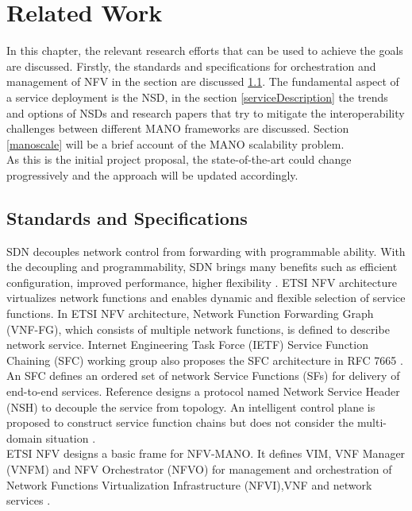 \chapter{Related Work}
\label{ch:Related Work}

In this chapter, the relevant research efforts that can be used to achieve the goals are discussed. Firstly, the standards and specifications for orchestration and management of NFV in the section are discussed \ref{standSpecs}. The fundamental aspect of a service deployment is the NSD, in the section \ref{serviceDescription} the trends and options of NSDs and research papers that try to mitigate the interoperability challenges between different MANO frameworks are discussed. Section \ref{manoscale} will be a brief account of the MANO scalability problem.\\

As this is the initial project proposal, the state-of-the-art could change progressively and the approach will be updated accordingly.


\section{Standards and Specifications}
\label{standSpecs}
SDN decouples network control from forwarding with programmable ability. With the decoupling and programmability, SDN brings many benefits such as efficient configuration, improved performance, higher flexibility \cite{xia2015survey}. ETSI NFV \cite{nfv2network} architecture virtualizes network functions and enables dynamic and flexible selection of service functions. In ETSI NFV architecture, Network Function Forwarding Graph (VNF-FG), which consists of multiple network functions, is defined to describe network service. Internet Engineering Task Force (IETF) Service Function Chaining (SFC) working group also proposes the SFC architecture in RFC 7665 \cite{halpern2015service}. An SFC defines an ordered set of network Service Functions (SFs) for delivery of end-to-end services. Reference \cite{quinn2016network} designs a protocol named Network Service Header (NSH) to decouple the service from topology. An intelligent control plane is proposed to construct service function chains but does not consider the multi-domain situation \cite{boucadair2016service}.\\

ETSI NFV designs a basic frame for NFV-MANO. It defines VIM, VNF Manager (VNFM) and NFV Orchestrator (NFVO) for management and orchestration of Network Functions Virtualization Infrastructure (NFVI),VNF and network services \cite{etsi2014gs}.


